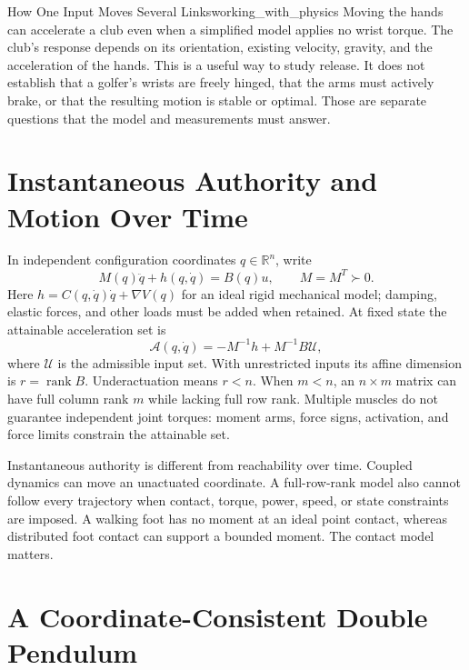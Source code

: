 \documentclass[12pt, openany]{book}
\theoremstyle{plain}
\begin{document}
\begin{keyidea}{How One Input Moves Several Links}{working_with_physics}
Moving the hands can accelerate a club even when a simplified model applies
no wrist torque. The club's response depends on its orientation, existing
velocity, gravity, and the acceleration of the hands. This is a useful way to
study release. It does not establish that a golfer's wrists are freely hinged,
that the arms must actively brake, or that the resulting motion is stable or
optimal. Those are separate questions that the model and measurements must answer.
\end{keyidea}

\section{Instantaneous Authority and Motion Over Time}

In independent configuration coordinates $q\in\mathbb R^n$, write
\begin{equation}
M(q)\ddot q+h(q,\dot q)=B(q)u,\qquad M=M^T\succ0.
\end{equation}
Here $h=C(q,\dot q)\dot q+\nabla V(q)$ for an ideal rigid mechanical model;
damping, elastic forces, and other loads must be added when retained.
At fixed state the attainable acceleration set is
\begin{equation}
\mathcal A(q,\dot q)=-M^{-1}h+M^{-1}B\mathcal U,
\end{equation}
where $\mathcal U$ is the admissible input set. With unrestricted inputs its
affine dimension is $r=\operatorname{rank}B$. Underactuation means $r<n$.
When $m<n$, an $n\times m$ matrix can have full column rank $m$ while lacking
full row rank. Multiple muscles do not guarantee independent joint torques:
moment arms, force signs, activation, and force limits constrain the attainable set.

Instantaneous authority is different from reachability over time. Coupled
dynamics can move an unactuated coordinate. A full-row-rank model also cannot
follow every trajectory when contact, torque, power, speed, or state constraints
are imposed. A walking foot has no moment at an ideal point contact, whereas
distributed foot contact can support a bounded moment. The contact model matters.

\section{A Coordinate-Consistent Double Pendulum}
\end{document}
